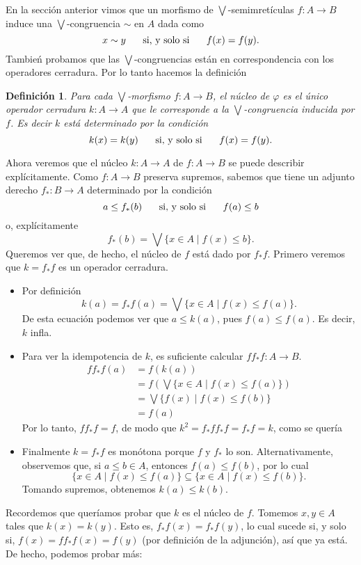 \documentclass[12pt,letterpaper,titlepage]{article}
\newtheorem*{defn}{Definición}
\theoremstyle{definition}
\newcommand\Sup{\bigvee}
\renewcommand\phi{\varphi}
\newcommand\simr{{\sim}}
\newcommand\ssi{\hspace{5mm}\text{ si, y solo si }\hspace{5mm}}
\newcommand\<{\langle}
\renewcommand\>{\rangle}
\begin{document}
En la sección anterior vimos que un morfismo de
$\Sup$-semimretículas $f:A\to B$
induce una $\Sup$-congruencia $\simr$ en $A$ dada como
\[
    x\sim y \ssi f(x) = f(y)
.\]
Tambień probamos que las $\Sup$-congruencias están en correspondencia
con los operadores cerradura.
Por lo tanto hacemos la definición
\begin{defn}
    Para cada $\Sup$-morfismo $f:A\to B$, el núcleo de $\phi$
    es el único operador cerradura $k:A\to A$ que le corresponde a
    la $\Sup$-congruencia inducida por $f$.
    Es decir $k$ está determinado por la condición
    \[
        k(x) = k(y) \ssi f(x) = f(y)
    .\]
\end{defn}

Ahora veremos que el núcleo $k:A\to A$ de $f:A\to B$ se puede
describir explícitamente.
Como $f:A\to B$ preserva supremos, sabemos que tiene un adjunto derecho
$f_*:B\to A$ determinado por la condición
\[
    a\leq f_*(b) \ssi f(a) \leq b
\]
o, explícitamente
\[
    f_*(b) = \Sup\{x\in A \mid f(x) \leq b\}
.\]
Queremos ver que, de hecho, el núcleo de $f$ está dado por $f_*f$.
Primero veremos que $k=f_*f$ es un operador cerradura.
\begin{itemize}
    \item 
    Por definición
    \[
        k(a) = f_*f(a) = \Sup\{x\in A \mid f(x) \leq f(a)\}
    .\]
    De esta ecuación podemos ver que $a\leq k(a)$, pues $f(a)\leq f(a)$.
    Es decir, $k$ infla.
    \item
    Para ver la idempotencia de $k$, es suficiente calcular $ff_*f:A\to B$.
    \begin{align*}
        ff_*f(a)
        &= f(k(a)) \\
        &= f(\Sup\{x\in A \mid f(x) \leq f(a) \}) \\
        &= \Sup\{f(x) \mid f(x) \leq f(b) \} \\
        &= f(a)
    \end{align*}
    Por lo tanto, $ff_*f=f$, de modo que $k^2 = f_*ff_*f=f_*f=k$, como
    se quería
    \item
    Finalmente $k=f_*f$ es monótona porque $f$ y $f_*$ lo son.
    Alternativamente, observemos que, si $a\leq b\in A$, entonces $f(a)\leq f(b)$,
    por lo cual
    \[
        \{x\in A \mid f(x) \leq f(a)\} \subseteq \{x\in A \mid f(x) \leq f(b) \}
    .\]
    Tomando supremos, obtenemos $k(a) \leq k(b)$.
\end{itemize}

Recordemos que queríamos probar que $k$ es el núcleo de $f$.
Tomemos $x,y\in A$ tales que $k(x)=k(y)$.
Esto es, $f_*f(x) = f_*f(y)$, lo cual sucede si, y solo si,
$f(x)=ff_*f(x)=f(y)$ (por definición de la adjunción), así que ya está.
De hecho, podemos probar más:
\end{document}
